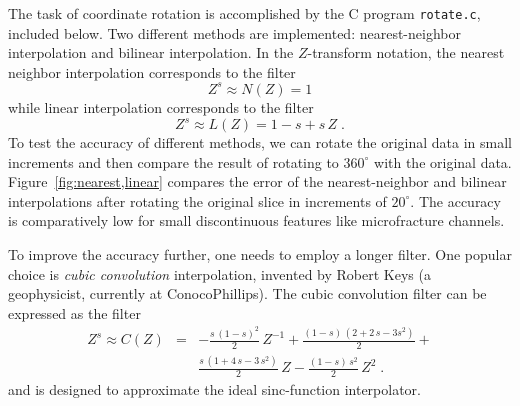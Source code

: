 The task of coordinate rotation is accomplished by the C program
\texttt{rotate.c}, included below. Two different methods are implemented: 
nearest-neighbor interpolation and bilinear interpolation. In the
$Z$-transform notation, the nearest neighbor interpolation corresponds
to the filter
\begin{equation}
\label{eq:nearest}
Z^s \approx N(Z) = 1
\end{equation}
while linear interpolation corresponds to the filter
\begin{equation}
\label{eq:linear}
Z^s \approx L(Z) = 1-s + s\,Z\;.
\end{equation}
To test the accuracy of different methods, we can rotate the original
data in small increments and then compare the result of rotating to
$360^{\circ}$ with the original data. Figure~\ref{fig:nearest,linear}
compares the error of the nearest-neighbor and bilinear interpolations
after rotating the original slice in increments of $20^{\circ}$. The
accuracy is comparatively low for small discontinuous features like
microfracture channels.

To improve the accuracy further, one needs to employ a longer
filter. One popular choice is \emph{cubic convolution} interpolation,
invented by Robert Keys (a geophysicist, currently at ConocoPhillips).
The cubic convolution filter can be expressed as the filter \cite[]{keys}
\begin{eqnarray}
\nonumber
Z^s \approx C(Z) & = & -\frac{s\,(1-s)^2}{2}\,Z^{-1} + \frac{(1-s)\,(2 + 2\,s - 3 s^2)}{2} + \\
&  & \frac{s\,(1 + 4\,s - 3\,s^2)}{2}\,Z - \frac{(1-s)\,s^2}{2}\,Z^2\;.
\label{eq:cubic}
\end{eqnarray}
and is designed to approximate the ideal sinc-function interpolator.

\lstset{language=c,numbers=left,numberstyle=\tiny,showstringspaces=false}



\lstset{language=python,numbers=left,numberstyle=\tiny,showstringspaces=false}


